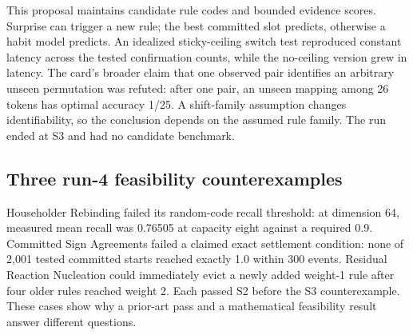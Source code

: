 This proposal maintains candidate rule codes and bounded evidence scores. Surprise can trigger a new rule; the best committed slot predicts, otherwise a habit model predicts. An idealized sticky-ceiling switch test reproduced constant latency across the tested confirmation counts, while the no-ceiling version grew in latency. The card's broader claim that one observed pair identifies an arbitrary unseen permutation was refuted: after one pair, an unseen mapping among 26 tokens has optimal accuracy 1/25. A shift-family assumption changes identifiability, so the conclusion depends on the assumed rule family. The run ended at S3 and had no candidate benchmark.

\subsection{Three run-4 feasibility counterexamples}

Householder Rebinding failed its random-code recall threshold: at dimension 64, measured mean recall was 0.76505 at capacity eight against a required 0.9. Committed Sign Agreements failed a claimed exact settlement condition: none of 2,001 tested committed starts reached exactly 1.0 within 300 events. Residual Reaction Nucleation could immediately evict a newly added weight-1 rule after four older rules reached weight 2. Each passed S2 before the S3 counterexample. These cases show why a prior-art pass and a mathematical feasibility result answer different questions.


